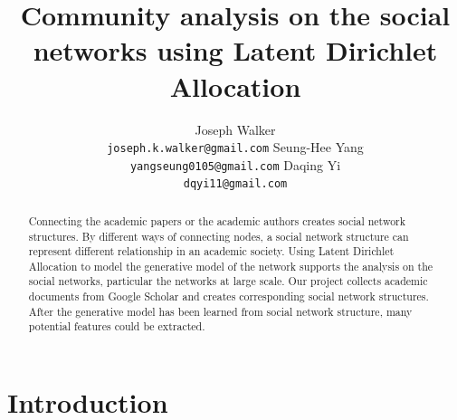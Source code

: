 \documentclass[letterpaper]{article}
\begin{document}
%
\title{Community analysis on the social networks using Latent Dirichlet Allocation}

\author{ 
	Joseph Walker 
	\\ \texttt{joseph.k.walker@gmail.com}
	\And Seung-Hee Yang 
	\\ \texttt{yangseung0105@gmail.com}
	\And Daqing Yi 
	\\ \texttt{dqyi11@gmail.com}
}
\maketitle

\begin{abstract}
Connecting the academic papers or the academic authors creates social network structures.
By different ways of connecting nodes, a social network structure can represent different relationship in an academic society.
Using Latent Dirichlet Allocation to model the generative model of the network supports the analysis on the social networks,
particular the networks at large scale.
Our project collects academic documents from Google Scholar and creates corresponding social network structures.
After the generative model has been learned from social network structure,
many potential features could be extracted.

\end{abstract}

\section{Introduction}
\end{document}

